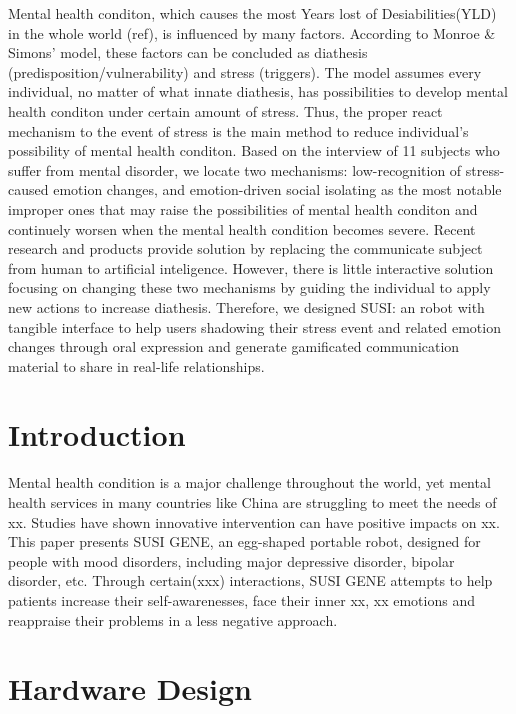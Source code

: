 \documentclass[manuscript,screen]{acmart}
\begin{document}
Mental health conditon, which causes the most Years lost of Desiabilities(YLD) in the whole world (ref), is influenced by many factors. According to Monroe & Simons' model, these factors can be concluded as diathesis (predisposition/vulnerability) and stress (triggers). The model assumes every individual, no matter of what innate diathesis, has possibilities to develop mental health conditon under certain amount of stress. Thus, the proper react mechanism to the event of stress is the main method to reduce individual's possibility of mental health conditon. Based on the interview of 11 subjects who suffer from mental disorder, we locate two mechanisms: low-recognition of stress-caused emotion changes, and emotion-driven social isolating as the most notable improper ones that may raise the possibilities of mental health conditon and continuely worsen when the mental health condition becomes severe. Recent research and products provide solution by replacing the communicate subject from human to artificial inteligence. However, there is little interactive solution focusing on changing these two mechanisms by guiding the individual to apply new actions to increase diathesis. Therefore, we designed SUSI: an robot with tangible interface to help users shadowing their stress event and related emotion changes through oral expression and generate gamificated communication material to share in real-life relationships.

\section{Introduction}

Mental health condition is a major challenge throughout the world, yet mental health services in many countries like China are struggling to meet the needs of xx. Studies have shown innovative intervention can have positive impacts on xx. This paper presents SUSI GENE, an egg-shaped portable robot, designed for people with mood disorders, including major depressive disorder, bipolar disorder, etc. Through certain(xxx) interactions, SUSI GENE attempts to help patients increase their self-awarenesses, face their inner xx, xx emotions and reappraise their problems in a less negative approach.



\section{Hardware Design}
\end{document}
